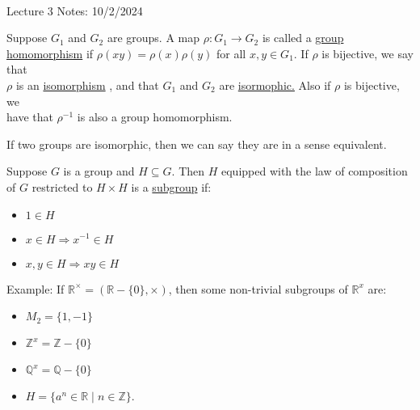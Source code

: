 \documentclass{book}
\newcommand{\exOne}{%
   \color{Purple}%
   \fontsize{13}{15}\selectfont%
}
\newcommand{\udefine}[1]{{%
   \setulcolor{Red}%
   \setul{0.14em}{0.07em}%
   \ul{#1}%
}}
\newcommand{\mySepTwo}[1][.]{%
   {\noindent\color{#1}{\rule{6.5in}{0.5mm}}}\\%
}
\newcommand{\retTwo}{\hfill\bigbreak}
\newcommand{\mHeader}[1]{{
   \color{Black}%
   \fontsize{20}{18}\selectfont%
   #1\retTwo
}}
\begin{document}
\mySepTwo

\mHeader{Lecture 3 Notes: 10/2/2024}

Suppose $G_1$ and $G_2$ are groups. A map $\rho: G_1 \longrightarrow G_2$ is called a \udefine{group\\ homomorphism} if $\rho(xy) = \rho(x)\rho(y)$ for all $x, y \in G_1$. If $\rho$ is bijective, we say that\\ $\rho$ is an \udefine{isomorphism}, and that $G_1$ and $G_2$ are \udefine{isormophic.} Also if $\rho$ is bijective, we\\ have that $\rho^{-1}$ is also a group homomorphism.\newpage

If two groups are isomorphic, then we can say they are in a sense equivalent.\retTwo

Suppose $G$ is a group and $H \subseteq G$. Then $H$ equipped with the law of composition of $G$ restricted to $H \times H$ is a \udefine{subgroup} if:\\ [-20pt]
\begin{itemize}
	\item $1 \in H$\\ [-20pt]
	\item $x \in H \Longrightarrow x^{-1} \in H$\\ [-20pt]
	\item $x, y \in H \Longrightarrow xy \in H$\retTwo
\end{itemize}

\exOne

Example: If $\mathbb{R}^\times = (\mathbb{R} - \{0\}, \times)$, then some non-trivial subgroups of $\mathbb{R}^x$ are:\\ [-20pt]

\begin{itemize}
	\item $M_2 = \{1, -1\}$\\ [-20pt]
	\item $\mathbb{Z}^x = \mathbb{Z} - \{0\}$\\ [-20pt]
	\item $\mathbb{Q}^x = \mathbb{Q} - \{0\}$\\ [-20pt]
	\item $H = \{a^n \in \mathbb{R} \mid n \in \mathbb{Z}\}$.
\end{itemize}
\end{document}
